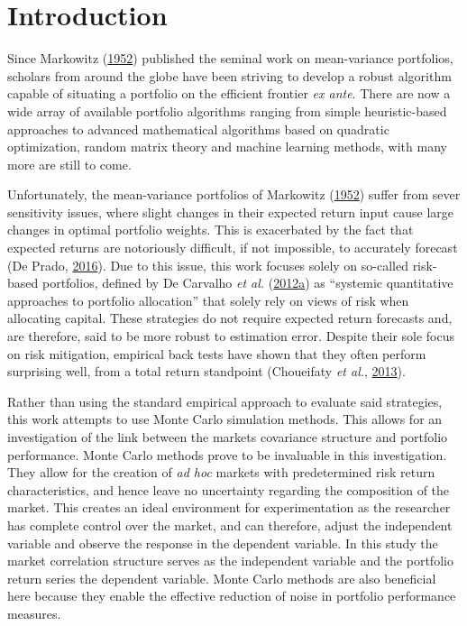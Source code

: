 \documentclass[11pt,preprint, authoryear]{elsarticle}
\numberwithin{equation}{section}
\numberwithin{figure}{section}
\numberwithin{table}{section}
\begin{document}
\headsep 35pt %




\hypertarget{introduction}{%
\section{\texorpdfstring{Introduction
\label{Introduction}}{Introduction }}\label{introduction}}

Since Markowitz (\protect\hyperlink{ref-markowitz}{1952}) published the
seminal work on mean-variance portfolios, scholars from around the globe
have been striving to develop a robust algorithm capable of situating a
portfolio on the efficient frontier \emph{ex ante}. There are now a wide
array of available portfolio algorithms ranging from simple
heuristic-based approaches to advanced mathematical algorithms based on
quadratic optimization, random matrix theory and machine learning
methods, with many more are still to come.

Unfortunately, the mean-variance portfolios of Markowitz
(\protect\hyperlink{ref-markowitz}{1952}) suffer from sever sensitivity
issues, where slight changes in their expected return input cause large
changes in optimal portfolio weights. This is exacerbated by the fact
that expected returns are notoriously difficult, if not impossible, to
accurately forecast (De Prado, \protect\hyperlink{ref-lopez}{2016}). Due
to this issue, this work focuses solely on so-called risk-based
portfolios, defined by De Carvalho \emph{et al.}
(\protect\hyperlink{ref-leote}{2012}\protect\hyperlink{ref-leote}{a}) as
``systemic quantitative approaches to portfolio allocation'' that solely
rely on views of risk when allocating capital. These strategies do not
require expected return forecasts and, are therefore, said to be more
robust to estimation error. Despite their sole focus on risk mitigation,
empirical back tests have shown that they often perform surprising well,
from a total return standpoint (Choueifaty \emph{et al.},
\protect\hyperlink{ref-choueifaty2013}{2013}).

Rather than using the standard empirical approach to evaluate said
strategies, this work attempts to use Monte Carlo simulation methods.
This allows for an investigation of the link between the markets
covariance structure and portfolio performance. Monte Carlo methods
prove to be invaluable in this investigation. They allow for the
creation of \emph{ad hoc} markets with predetermined risk return
characteristics, and hence leave no uncertainty regarding the
composition of the market. This creates an ideal environment for
experimentation as the researcher has complete control over the market,
and can therefore, adjust the independent variable and observe the
response in the dependent variable. In this study the market correlation
structure serves as the independent variable and the portfolio return
series the dependent variable. Monte Carlo methods are also beneficial
here because they enable the effective reduction of noise in portfolio
performance measures.
\end{document}
